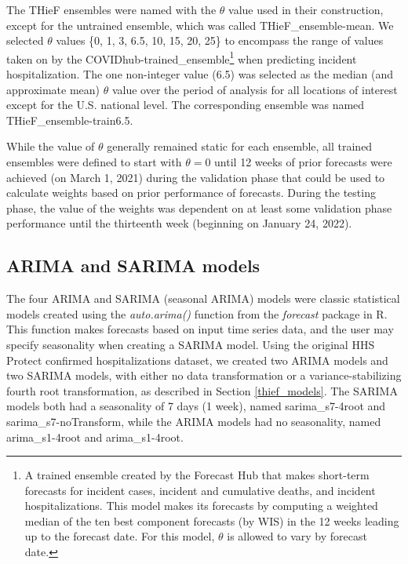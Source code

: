 \documentclass[thesis]{umassthesis}  %
\begin{document}
The THieF ensembles were named with the $\theta$ value used in their construction, except for the untrained ensemble, which was called THieF\_ensemble-mean. We selected $\theta$ values \{0, 1, 3, 6.5, 10, 15, 20, 25\} to encompass the range of values taken on by the COVIDhub-trained\_ensemble\footnote{A trained ensemble created by the Forecast Hub that makes short-term forecasts for incident cases, incident and cumulative deaths, and incident hospitalizations. This model makes its forecasts by computing a weighted median of the ten best component forecasts (by WIS) in the 12 weeks leading up to the forecast date. For this model, $\theta$ is allowed to vary by forecast date\cite{ensembles_info, ensemble_methods}.} when predicting incident hospitalization\cite{ensemble_methods}. The one non-integer value (6.5) was selected as the median (and approximate mean) $\theta$ value over the period of analysis for all locations of interest except for the U.S. national level. The corresponding ensemble was named THieF\_ensemble-train6.5.

While the value of $\theta$ generally remained static for each ensemble, all trained ensembles were defined to start with $\theta = 0$ until 12 weeks of prior forecasts were achieved (on March 1, 2021) during the validation phase that could be used to calculate weights based on prior performance of forecasts. During the testing phase, the value of the weights was dependent on at least some validation phase performance until the thirteenth week (beginning on January 24, 2022).

\subsection{ARIMA and SARIMA models} \label{sarima_models}
The four ARIMA and SARIMA (seasonal ARIMA) models were classic statistical models created using the \textit{auto.arima()} function from the \textit{forecast} package in R. This function makes forecasts based on input time series data, and the user may specify seasonality when creating a SARIMA model. Using the original HHS Protect confirmed hospitalizations dataset, we created two ARIMA models and two SARIMA models, with either no data transformation or a variance-stabilizing fourth root transformation, as described in Section \ref{thief_models}. The SARIMA models both had a seasonality of 7 days (1 week), named sarima\_s7-4root and sarima\_s7-noTransform, while the ARIMA models had no seasonality, named arima\_s1-4root and arima\_s1-4root.
\end{document}
